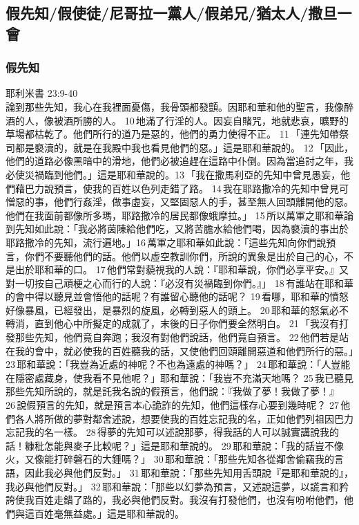 
\subsection{假先知/假使徒/尼哥拉一黨人/假弟兄/猶太人/撒旦一會}
\subsubsection{假先知}
 耶利米書 23:9-40\\
論到那些先知，我心在我裡面憂傷，我骨頭都發顫。因耶和華和他的聖言，我像醉酒的人，像被酒所勝的人。 10 地滿了行淫的人。因妄自賭咒，地就悲哀，曠野的草場都枯乾了。他們所行的道乃是惡的，他們的勇力使得不正。 11 「連先知帶祭司都是褻瀆的，就是在我殿中我也看見他們的惡。」這是耶和華說的。 12 「因此，他們的道路必像黑暗中的滑地，他們必被追趕在這路中仆倒。因為當追討之年，我必使災禍臨到他們。」這是耶和華說的。13 「我在撒馬利亞的先知中曾見愚妄，他們藉巴力說預言，使我的百姓以色列走錯了路。 14 我在耶路撒冷的先知中曾見可憎惡的事，他們行姦淫，做事虛妄，又堅固惡人的手，甚至無人回頭離開他的惡。他們在我面前都像所多瑪，耶路撒冷的居民都像蛾摩拉。」 15 所以萬軍之耶和華論到先知如此說：「我必將茵陳給他們吃，又將苦膽水給他們喝，因為褻瀆的事出於耶路撒冷的先知，流行遍地。」16 萬軍之耶和華如此說：「這些先知向你們說預言，你們不要聽他們的話。他們以虛空教訓你們，所說的異象是出於自己的心，不是出於耶和華的口。 17 他們常對藐視我的人說：『耶和華說，你們必享平安。』又對一切按自己頑梗之心而行的人說：『必沒有災禍臨到你們。』」 18 有誰站在耶和華的會中得以聽見並會悟他的話呢？有誰留心聽他的話呢？ 19 看哪，耶和華的憤怒好像暴風，已經發出，是暴烈的旋風，必轉到惡人的頭上。 20 耶和華的怒氣必不轉消，直到他心中所擬定的成就了，末後的日子你們要全然明白。 21 「我沒有打發那些先知，他們竟自奔跑；我沒有對他們說話，他們竟自預言。 22 他們若是站在我的會中，就必使我的百姓聽我的話，又使他們回頭離開惡道和他們所行的惡。」23 耶和華說：「我豈為近處的神呢？不也為遠處的神嗎？」 24 耶和華說：「人豈能在隱密處藏身，使我看不見他呢？」耶和華說：「我豈不充滿天地嗎？ 25 我已聽見那些先知所說的，就是託我名說的假預言，他們說：『我做了夢！我做了夢！』 26 說假預言的先知，就是預言本心詭詐的先知，他們這樣存心要到幾時呢？ 27 他們各人將所做的夢對鄰舍述說，想要使我的百姓忘記我的名，正如他們列祖因巴力忘記我的名一樣。 28 得夢的先知可以述說那夢，得我話的人可以誠實講說我的話！糠秕怎能與麥子比較呢？」這是耶和華說的。 29 耶和華說：「我的話豈不像火，又像能打碎磐石的大錘嗎？」 30 耶和華說：「那些先知各從鄰舍偷竊我的言語，因此我必與他們反對。」 31 耶和華說：「那些先知用舌頭說『是耶和華說的』，我必與他們反對。」 32 耶和華說：「那些以幻夢為預言，又述說這夢，以謊言和矜誇使我百姓走錯了路的，我必與他們反對。我沒有打發他們，也沒有吩咐他們，他們與這百姓毫無益處。」這是耶和華說的。
